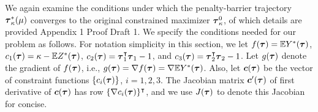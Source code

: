 \documentclass[../main.tex]{subfiles}
\begin{document}
We again examine the conditions under which the penalty-barrier trajectory $\boldsymbol{\tau}^*_{\kappa}(\mu)$ converges to the original constrained maximizer $\boldsymbol{\tau}^0_{\kappa}$, of which details are provided Appendix 1 Proof Draft 1. We specify  the conditions needed for our problem as follows. For notation simplicity in this section, we let $f(\boldsymbol{\tau}) = \mathbb{E} Y^*(\boldsymbol{\tau})$, $c_1 (\boldsymbol{\tau}) = \kappa - \mathbb{E}Z^*(\boldsymbol{\tau})$, $c_2(\boldsymbol{\tau}) = \boldsymbol{\tau}_1^\intercal \boldsymbol{\tau}_1 - 1$, and $c_3(\boldsymbol{\tau}) = \boldsymbol{\tau}_2^\intercal \boldsymbol{\tau}_2 - 1$. Let $g(\boldsymbol{\tau})$ denote the gradient of $f(\boldsymbol{\tau})$, i.e., $g(\boldsymbol{\tau}) = \nabla f(\boldsymbol{\tau}) = \nabla \mathbb{E}Y^*(\boldsymbol{\tau})$. Also, let $\boldsymbol{c}(\boldsymbol{\tau})$ be the vector of constraint functions $\{c_i(\boldsymbol{\tau})\}$, $i = 1, 2, 3$. The Jacobian matrix $\boldsymbol{c}^{\prime}(\boldsymbol{\tau})$ of first derivative of $\boldsymbol{c}(\boldsymbol{\tau})$ has row $\{\nabla c_{i}(\boldsymbol{\tau})\}^{\intercal}$, and we use $J(\boldsymbol{\tau})$ to denote this Jacobian for concise.\\
\end{document}
